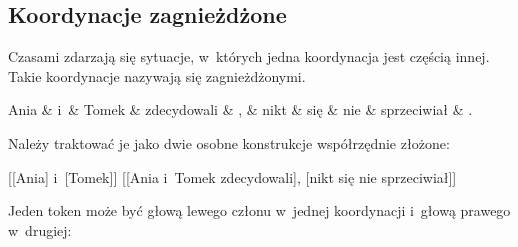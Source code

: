 
\subsection{Koordynacje zagnieżdżone}

Czasami zdarzają się sytuacje, w~których jedna koordynacja jest częścią innej. Takie koordynacje nazywają się zagnieżdżonymi.  

\begin{exe}
\ex \label{zagnieżdżona}
\begin{dependency}[baseline=-\the\dimexpr\fontdimen22\textfont2\relax]
\begin{deptext}[column sep=1em]
Ania \& i~\& Tomek \& zdecydowali \& , \& nikt \& się \& nie \& sprzeciwiał \& .  \\ 
\end{deptext}
\end{dependency}
\end{exe}

Należy traktować je jako dwie osobne konstrukcje współrzędnie złożone:

\begin{exe}
\ex \label{zagnieżdżona-1}
{[[Ania] i~[Tomek]]}
\ex \label{zagnieżdżona-2}
{[[Ania i~Tomek zdecydowali], [nikt się nie sprzeciwiał]]}
\end{exe}

Jeden token może być głową lewego członu w~jednej koordynacji i~głową prawego w~drugiej:

\begin{exe}
\ex \label{wojna+pokój}
\end{exe}

